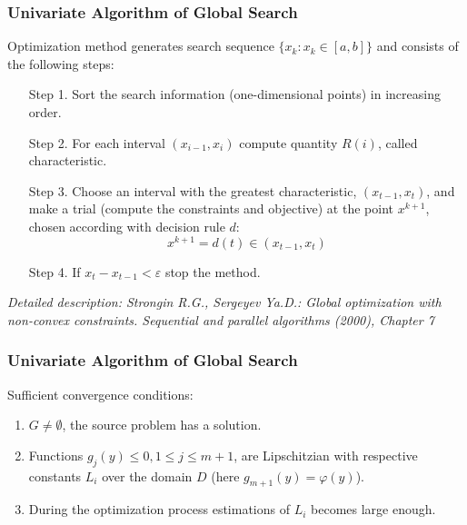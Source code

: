 \documentclass[aspectratio=1610]{beamer}
\begin{document}
\begin{frame}
  \frametitle{Univariate Algorithm of Global Search}
  Optimization method generates search sequence \(\{x_k:x_k\in[a,b]\}\) and consists of the following steps:
  \begin{enumerate}
    \setlength{\itemindent}{.1in}
    \item[Step 1.] Sort the search information (one-dimensional points) in increasing order.
    \item[Step 2.] For each interval \((x_{i-1}, x_i)\) compute quantity \(R(i)\), called characteristic.
    \item[Step 3.] Choose an interval with the greatest characteristic, \((x_{t-1}, x_{t})\), and
    make a trial (compute the constraints and objective) at the point \(x^{k+1}\), chosen according with decision rule \(d\):
    \begin{displaymath}
      x^{k+1}=d(t)\in (x_{t-1}, x_{t})
    \end{displaymath}
    \item[Step 4.] If \(x_{t}-x_{t-1}<\varepsilon\) stop the method.
  \end{enumerate}
  \textit{\footnotesize	{Detailed description: Strongin R.G., Sergeyev Ya.D.: Global optimization with non-convex constraints. Sequential and parallel algorithms (2000), Chapter 7}}
\end{frame}

\begin{frame}
  \frametitle{Univariate Algorithm of Global Search}
  Sufficient convergence conditions:
  \begin{enumerate}
    \item \(G\ne\emptyset\), the source problem has a solution.
    \item Functions \(g_j(y)\leqslant 0, 1\leqslant j\leqslant m + 1\), are Lipschitzian with
respective constants \(L_i\) over the domain \(D\) (here \(g_{m+1}(y)=\varphi(y)\)).
    \item During the optimization process estimations of \(L_i\) becomes large enough.
  \end{enumerate}
\end{frame}
\end{document}
